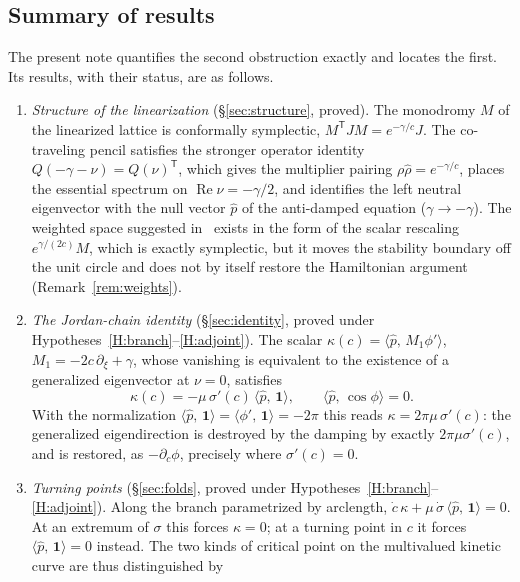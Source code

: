 \documentclass[11pt]{article}
\theoremstyle{plain}
\theoremstyle{definition}
\theoremstyle{remark}
\newcommand{\ip}[2]{\langle #1,\,#2\rangle}
\newcommand{\ph}{\hat p}
\newcommand{\one}{\mathbf 1}
\newcommand{\T}{\mathsf T}
\newcommand{\tagP}{\textsf{proved}}
\newcommand{\tagC}[1]{\textsf{proved under #1}}
\begin{document}
\subsection{Summary of results}

The present note quantifies the second obstruction exactly and locates the first. Its
results, with their status, are as follows.

\begin{enumerate}[leftmargin=2.2em,label=(\roman*)]
\item \emph{Structure of the linearization} (\S\ref{sec:structure}, \tagP). The monodromy
  $M$ of the linearized lattice is conformally symplectic, $M^{\T}JM=e^{-\gamma/c}J$. The
  co-traveling pencil satisfies the stronger operator identity $Q(-\gamma-\nu)=Q(\nu)^{\T}$,
  which gives the multiplier pairing $\rho\hat\rho=e^{-\gamma/c}$, places the essential
  spectrum on $\operatorname{Re}\nu=-\gamma/2$, and identifies the left neutral eigenvector
  with the null vector $\ph$ of the anti-damped equation ($\gamma\to-\gamma$). The weighted
  space suggested in~\cite{VCKX20} exists in the form of the scalar rescaling
  $e^{\gamma/(2c)}M$, which is exactly symplectic, but it moves the stability boundary off the
  unit circle and does not by itself restore the Hamiltonian argument
  (Remark~\ref{rem:weights}).
\item \emph{The Jordan-chain identity} (\S\ref{sec:identity},
  \tagC{Hypotheses~\ref{H:branch}--\ref{H:adjoint}}). The scalar
  $\kappa(c)=\ip{\ph}{M_1\phi'}$, $M_1=-2c\,\partial_\xi+\gamma$, whose vanishing is
  equivalent to the existence of a generalized eigenvector at $\nu=0$, satisfies
  \begin{equation}\label{eq:main}
    \kappa(c)=-\mu\,\sigma'(c)\,\ip{\ph}{\one},\qquad \ip{\ph}{\cos\phi}=0 .
  \end{equation}
  With the normalization $\ip{\ph}{\one}=\ip{\phi'}{\one}=-2\pi$ this reads
  $\kappa=2\pi\mu\,\sigma'(c)$: the generalized eigendirection is destroyed by the damping by
  exactly $2\pi\mu\sigma'(c)$, and is restored, as $-\partial_c\phi$, precisely where
  $\sigma'(c)=0$.
\item \emph{Turning points} (\S\ref{sec:folds},
  \tagC{Hypotheses~\ref{H:branch}--\ref{H:adjoint}}). Along the branch parametrized by
  arclength, $\dot c\,\kappa+\mu\,\dot\sigma\,\ip{\ph}{\one}=0$. At an extremum of $\sigma$
  this forces $\kappa=0$; at a turning point in $c$ it forces $\ip{\ph}{\one}=0$ instead. The
  two kinds of critical point on the multivalued kinetic curve are thus distinguished by

\end{enumerate}
\end{document}
